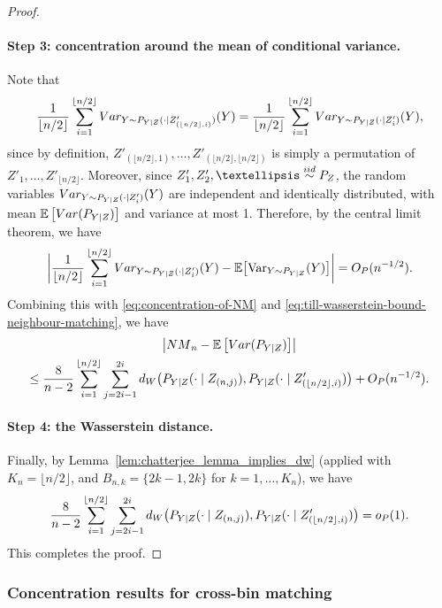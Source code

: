 \documentclass[12pt]{article}
\newcommand{\EE}[1]{\mathbb{E}\left[{#1}\right]}
\newcommand{\VPst}[2]{\mathrm{Var}_{{#1}}({#2})}
\newcommand{\iidsim}{\stackrel{\textnormal{iid}}{\sim}}
\begin{document}
\begin{proof}
\paragraph{Step 3: concentration around the mean of conditional variance.}
Note that
\[
\frac{1}{\lfloor n/2 \rfloor} \sum_{i=1}^{\lfloor n/2\rfloor} \textnormal{Var}_{Y \sim P_{Y|Z}(\cdot\mid Z'_{(\lfloor n/2\rfloor, i)})}(Y)
= \frac{1}{\lfloor n/2\rfloor} \sum_{i=1}^{\lfloor n/2\rfloor} \textnormal{Var}_{Y \sim P_{Y|Z}(\cdot\mid Z'_{i})}(Y),
\]
since by definition, $Z'_{(\lfloor n/2\rfloor, 1)},\dots,Z'_{(\lfloor n/2\rfloor, \lfloor n/2\rfloor)}$ is simply a permutation of $Z'_1,\dots,Z'_{\lfloor n/2\rfloor}$. 
Moreover, since $Z'_1,Z'_2,\ldots \iidsim P_Z$, the random variables $\textnormal{Var}_{Y \sim P_{Y|Z}(\cdot\mid Z'_{i})}(Y)$ are independent and identically distributed, with mean $\EE{\textnormal{Var}(P_{Y|Z})}$ and variance at most 1. Therefore, by the central limit theorem, we have
\[
\biggl| \frac{1}{\lfloor n/2\rfloor } \sum_{i=1}^{\lfloor n/2\rfloor} \textnormal{Var}_{Y \sim P_{Y|Z}(\cdot\mid Z'_{i})}(Y) -  \mathbb{E}\bigl[\VPst{Y\sim P_{Y\mid Z}}{Y}\bigr]\biggr| =  {\rm O}_P(n^{-1/2}).
\]
Combining this with \eqref{eq:concentration-of-NM} and \eqref{eq:till-wasserstein-bound-neighbour-matching}, we have
\begin{multline*}
    \left|{\rm NM}_n - \EE{\textnormal{Var}(P_{Y|Z})}\right|\\\leq 
     \frac{8}{n-2}\sum_{i=1}^{\lfloor n/2\rfloor} \sum_{j = 2i-1}^{2i} {\rm d}_{\rm W}\big(P_{Y|Z}(\cdot\mid Z_{(n,j)}), P_{Y|Z}(\cdot\mid Z'_{(\lfloor n/2\rfloor, i)})\big)  + {\rm O}_P(n^{-1/2}).
\end{multline*}

\paragraph{Step 4: the Wasserstein distance.}
Finally, by Lemma~\ref{lem:chatterjee_lemma_implies_dw} (applied with $K_n = \lfloor n/2\rfloor$, and $B_{n,k} = \{2k-1,2k\}$ for $k=1,\dots,K_n$), we have
\[
\frac{8}{n-2}\sum_{i=1}^{\lfloor n/2\rfloor} \sum_{j = 2i-1}^{2i} {\rm d}_{\rm W}\big(P_{Y|Z}(\cdot\mid Z_{(n,j)}), P_{Y|Z}(\cdot\mid Z'_{(\lfloor n/2\rfloor, i)})\big)={\rm o}_P(1).
\]
This completes the proof.
\end{proof}
\subsubsection{Concentration results for cross-bin matching}
\end{document}
